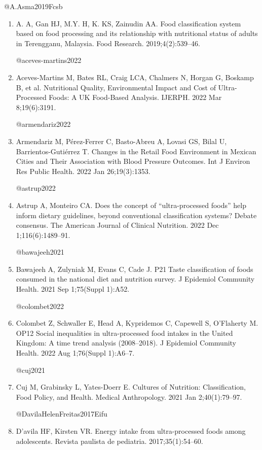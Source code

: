 \documentclass[
]{article}
\begin{document}
@A.Asma2019Fcsb

\begin{enumerate}
\def\labelenumi{\arabic{enumi}.}
\item
  A. A, Gan HJ, M.Y. H, K. KS, Zainudin AA. Food classification system
  based on food processing and its relationship with nutritional status
  of adults in Terengganu, Malaysia. Food Research. 2019;4(2):539--46.

  @aceves-martins2022
\item
  Aceves-Martins M, Bates RL, Craig LCA, Chalmers N, Horgan G, Boskamp
  B, et al. Nutritional Quality, Environmental Impact and Cost of
  Ultra-Processed Foods: A UK Food-Based Analysis. IJERPH. 2022 Mar
  8;19(6):3191.

  @armendariz2022
\item
  Armendariz M, Pérez-Ferrer C, Basto-Abreu A, Lovasi GS, Bilal U,
  Barrientos-Gutiérrez T. Changes in the Retail Food Environment in
  Mexican Cities and Their Association with Blood Pressure Outcomes. Int
  J Environ Res Public Health. 2022 Jan 26;19(3):1353.

  @astrup2022
\item
  Astrup A, Monteiro CA. Does the concept of ``ultra-processed foods''
  help inform dietary guidelines, beyond conventional classification
  systems? Debate consensus. The American Journal of Clinical Nutrition.
  2022 Dec 1;116(6):1489--91.

  @bawajeeh2021
\item
  Bawajeeh A, Zulyniak M, Evans C, Cade J. P21 Taste classification of
  foods consumed in the national diet and nutrition survey. J Epidemiol
  Community Health. 2021 Sep 1;75(Suppl 1):A52.

  @colombet2022
\item
  Colombet Z, Schwaller E, Head A, Kypridemos C, Capewell S, O'Flaherty
  M. OP12 Social inequalities in ultra-processed food intakes in the
  United Kingdom: A time trend analysis (2008--2018). J Epidemiol
  Community Health. 2022 Aug 1;76(Suppl 1):A6--7.

  @cuj2021
\item
  Cuj M, Grabinsky L, Yates-Doerr E. Cultures of Nutrition:
  Classification, Food Policy, and Health. Medical Anthropology. 2021
  Jan 2;40(1):79--97.

  @DavilaHelenFreitas2017Eifu
\item
  D'avila HF, Kirsten VR. Energy intake from ultra-processed foods among
  adolescents. Revista paulista de pediatria. 2017;35(1):54--60.


\end{enumerate}
\end{document}
